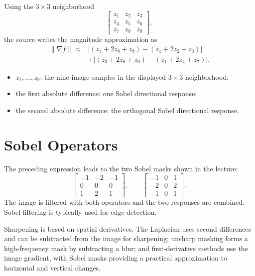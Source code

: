 \documentclass[11pt,a4paper,oneside]{report}
\newcommand{\mathlegend}[1]{%
  \par\vspace{0.2em}{\small\itshape where}\par
  \begin{itemize}[leftmargin=1.7em,topsep=0.15em,itemsep=0.12em]
  #1
  \end{itemize}
}
\begin{document}
Using the $3\times3$ neighborhood
\[
\begin{bmatrix}
z_1&z_2&z_3\\
z_4&z_5&z_6\\
z_7&z_8&z_9
\end{bmatrix},
\]
the source writes the magnitude approximation as
\begin{equation}
\begin{aligned}
\lVert\nabla f\rVert\approx{}&\left|(z_7+2z_8+z_9)-(z_1+2z_2+z_3)\right|\\
&+\left|(z_3+2z_6+z_9)-(z_1+2z_4+z_7)\right|.
\end{aligned}
\label{eq:sobel-z-form}
\end{equation}
\mathlegend{
  \item $z_1,\ldots,z_9$: the nine image samples in the displayed $3\times3$ neighborhood;
  \item the first absolute difference: one Sobel directional response;
  \item the second absolute difference: the orthogonal Sobel directional response.
}

\section{Sobel Operators}

The preceding expression leads to the two Sobel masks shown in the lecture:
\[
\begin{bmatrix}
-1&-2&-1\\
0&0&0\\
1&2&1
\end{bmatrix},
\qquad
\begin{bmatrix}
-1&0&1\\
-2&0&2\\
-1&0&1
\end{bmatrix}.
\]
The image is filtered with both operators and the two responses are combined. Sobel filtering is typically used for edge detection.



\FloatBarrier
\begin{chaptersummary}
Sharpening is based on spatial derivatives. The Laplacian uses second differences and can be subtracted from the image for sharpening; unsharp masking forms a high-frequency mask by subtracting a blur; and first-derivative methods use the image gradient, with Sobel masks providing a practical approximation to horizontal and vertical changes.
\end{chaptersummary}
\end{document}
